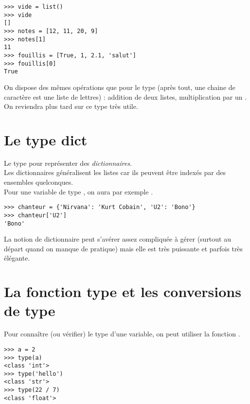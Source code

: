 \begin{pys}\begin{verbatim}
>>> vide = list()
>>> vide
[]
>>> notes = [12, 11, 20, 9]
>>> notes[1]
11
>>> fouillis = [True, 1, 2.1, 'salut']
>>> fouillis[0]
True
\end{verbatim}
\end{pys}

On dispose des mêmes opérations que pour le type  (après tout, une chaine de caractère est une liste de lettres) : addition de deux listes, multiplication par un .\\

On reviendra plus tard sur ce type très utile.

\section{Le type dict}
Le type  pour représenter des \textit{dictionnaires}.\\
Les dictionnaires généralisent les listes car ils peuvent être indexés par des ensembles quelconques.\\
Pour une variable  de type , on aura par exemple .

\begin{pys}\begin{verbatim}
>>> chanteur = {'Nirvana': 'Kurt Cobain', 'U2': 'Bono'}
>>> chanteur['U2']
'Bono'
\end{verbatim}
\end{pys}


La notion de dictionnaire peut s'avérer assez compliquée à gérer (surtout au départ quand on manque de pratique) mais elle est très puissante et parfois très élégante.\\

\section{La fonction type et les conversions de type}

Pour connaître (ou vérifier) le type d'une variable, on peut utiliser la fonction .

\begin{pys}\begin{verbatim}
>>> a = 2
>>> type(a)
<class 'int'>
>>> type('hello')
<class 'str'>
>>> type(22 / 7)
<class 'float'>
\end{verbatim}
\end{pys}


